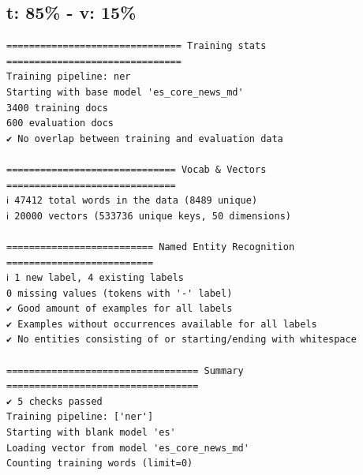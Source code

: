 \documentclass[12pt,a4paper,]{scrartcl}
\begin{document}
\hypertarget{t-85---v-15}{%
\subsection{t: 85\% - v: 15\%}\label{t-85---v-15}}

\begin{verbatim}
=============================== Training stats ===============================
Training pipeline: ner
Starting with base model 'es_core_news_md'
3400 training docs
600 evaluation docs
✔ No overlap between training and evaluation data

============================== Vocab & Vectors ==============================
ℹ 47412 total words in the data (8489 unique)
ℹ 20000 vectors (533736 unique keys, 50 dimensions)

========================== Named Entity Recognition ==========================
ℹ 1 new label, 4 existing labels
0 missing values (tokens with '-' label)
✔ Good amount of examples for all labels
✔ Examples without occurrences available for all labels
✔ No entities consisting of or starting/ending with whitespace

================================== Summary ==================================
✔ 5 checks passed
Training pipeline: ['ner']
Starting with blank model 'es'
Loading vector from model 'es_core_news_md'
Counting training words (limit=0)
\end{verbatim}
\end{document}
